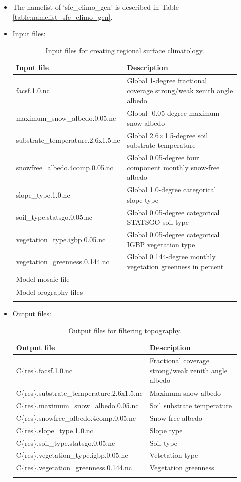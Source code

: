 \documentclass[11pt,fleqn]{report}              %
\begin{document}
\begin{itemize}

\item The namelist of `sfc\_climo\_gen' is described in Table \ref{table:namelist_sfc_climo_gen}.
\item Input files:
{
\fontsize{10}{12}\selectfont
\begin{longtable}{ p{0.32\linewidth} | p{0.61\linewidth}  }
\hline
\hline
 Input file & Description \\
\hline
 facsf.1.0.nc & Global 1-degree fractional coverage strong/weak zenith angle albedo \\
 maximum\_snow\_albedo.0.05.nc & Global -0.05-degree maximum snow albedo \\
 substrate\_temperature.2.6x1.5.nc & Global 2.6$\times$1.5-degree soil substrate temperature \\
 snowfree\_albedo.4comp.0.05.nc & Global 0.05-degree four component monthly snow-free albedo \\
 slope\_type.1.0.nc & Global 1.0-degree categorical slope type \\
 soil\_type.statsgo.0.05.nc & Global 0.05-degree categorical STATSGO soil type \\
 vegetation\_type.igbp.0.05.nc & Global 0.05-degree categorical IGBP vegetation type \\
 vegetation\_greenness.0.144.nc & Global 0.144-degree monthly vegetation greenness in percent \\
 Model mosaic file & \\
 Model orography files & \\
\hline
\caption{Input files for creating regional surface climatology.}
\label{table:var_surf_climo_input}
\end{longtable}
}

\item Output files:
{
\fontsize{10}{12}\selectfont
\begin{longtable}{p{0.4\linewidth} | p{0.53\linewidth} }
\hline
\hline
 Output file & Description \\
\hline
 C\{res\}.facsf.1.0.nc & Fractional coverage strong/weak zenith angle albedo \\
 C\{res\}.substrate\_temperature.2.6x1.5.nc & Maximum snow albedo  \\
 C\{res\}.maximum\_snow\_albedo.0.05.nc & Soil substrate temperature \\
 C\{res\}.snowfree\_albedo.4comp.0.05.nc & Snow free albedo \\
 C\{res\}.slope\_type.1.0.nc & Slope type \\
 C\{res\}.soil\_type.statsgo.0.05.nc & Soil type \\
 C\{res\}.vegetation\_type.igbp.0.05.nc & Vetetation type \\
 C\{res\}.vegetation\_greenness.0.144.nc & Vegetation greenness \\
\hline
\caption{Output files for filtering topography.}
\label{table:var_filt_output}
\end{longtable}
}

\end{itemize}
\end{document}
